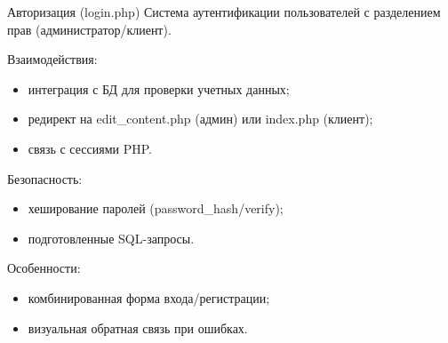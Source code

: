 Авторизация (login.php)
Система аутентификации пользователей с разделением прав (администратор/клиент).

Взаимодействия:
\begin{itemize}
	\item интеграция с БД для проверки учетных данных;
	\item редирект на edit\_content.php (админ) или index.php (клиент);
	\item связь с сессиями PHP.
\end{itemize}

Безопасность:
\begin{itemize}
	\item хеширование паролей (password\_hash/verify);
	\item подготовленные SQL-запросы.
\end{itemize}

Особенности:
\begin{itemize}
	\item комбинированная форма входа/регистрации;
	\item визуальная обратная связь при ошибках.
\end{itemize}

